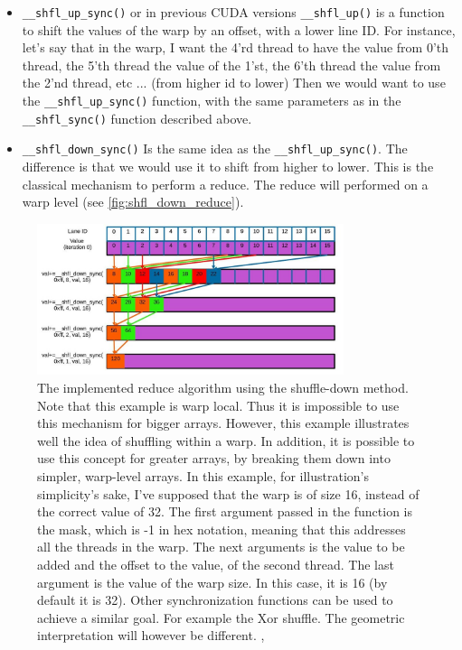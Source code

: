 \begin{itemize}
    \item \verb|__shfl_up_sync()| or in previous CUDA versions \verb|__shfl_up()| is a function to 
        shift the values of the warp by an offset, with a lower line ID. For instance, let's say that in the warp, I want 
        the 4'rd thread to have the value from 0'th thread, the 5'th thread the value of the 1'st, the 6'th 
        thread the value from the 2'nd thread, etc ... (from higher id to lower) Then we would want to use the \verb|__shfl_up_sync()| 
        function, with the same parameters as in the \verb|__shfl_sync()| function described above.
    \item \verb|__shfl_down_sync()| Is the same idea as the \verb|__shfl_up_sync()|. The difference is that 
        we would use it to shift from higher to lower. This is the classical mechanism to perform a reduce. The reduce will performed 
        on a warp level (see \autoref{fig:shfl_down_reduce}). 
\end{itemize}

\begin{figure}[ht!]
  \centering
  \includegraphics[width=0.8\textwidth]{pngs/shfl_down_reduce.jpg}
  \caption{The implemented reduce algorithm using the shuffle-down method. 
  Note that this example is warp local. Thus it is impossible to use this mechanism for bigger arrays. 
  However, this example illustrates well the idea of shuffling within a warp. In addition, it is possible 
to use this concept for greater arrays, by breaking them down into simpler, warp-level arrays. 
In this example, for illustration's simplicity's sake, 
I've supposed that the warp is of size 16, instead of the correct value of 32. The first argument passed in the 
function is the mask, which is -1 in hex notation, meaning that this addresses all the threads in the warp. The next arguments 
is the value to be added and the offset to the value, of the second thread. The last argument is the value of the warp size. In this case, 
it is 16 (by default it is 32). Other synchronization functions can be used to achieve a similar goal. For example the Xor shuffle. 
The geometric interpretation will however be different. \cite{giles_warp_nodate}, \cite{armour_warp_nodate}}
  \label{fig:shfl_down_reduce}
\end{figure}

